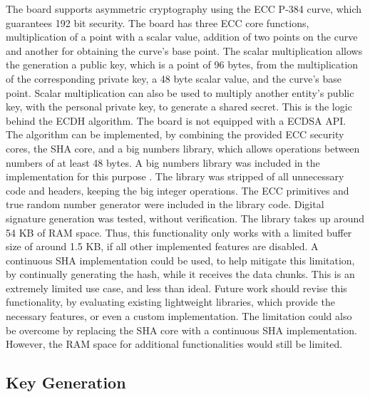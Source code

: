 The board supports asymmetric cryptography using the ECC P-384 curve, which guarantees 192 bit security. The board has three ECC core functions, multiplication of a point with a scalar value, addition of two points on the curve and another for obtaining the curve's base point. The scalar multiplication allows the generation a public key, which is a point of 96 bytes, from the multiplication of the corresponding private key, a 48 byte scalar value, and the curve's base point. Scalar multiplication can also be used to multiply another entity's public key, with the personal private key, to generate a shared secret. This is the logic behind the ECDH algorithm.
The board is not equipped with a \ac{ECDSA} API. The algorithm can be implemented, by combining the provided ECC security cores, the SHA core, and a big numbers library, which allows operations between numbers of at least 48 bytes.
A big numbers library was included in the implementation for this purpose \cite{libecc}. The library was stripped of all unnecessary code and headers, keeping the big integer operations. The ECC primitives and true random number generator were included in the library code. Digital signature generation was tested, without verification. The library takes up around 54 KB of RAM space. Thus, this functionality only works with a limited buffer size of around 1.5 KB, if all other implemented features are disabled. A continuous SHA implementation could be used, to help mitigate this limitation, by continually generating the hash, while it receives the data chunks.
This is an extremely limited use case, and less than ideal. Future work should revise this functionality, by evaluating existing lightweight libraries, which provide the necessary features, or even a custom implementation. The limitation could also be overcome by replacing the SHA core with a continuous SHA implementation. However, the RAM space for additional functionalities would still be limited.

\subsection{Key Generation}\label{chap:implementation:services:key-generation}

